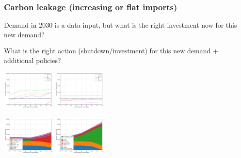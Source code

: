 \documentclass[xcolor=dvipsnames]{beamer}
\begin{document}
\begin{frame}
  \frametitle{Carbon leakage (increasing or flat imports)}

  \item Demand in 2030 is a data input, but what is the right investment now for this new demand?
  \item What is the right action (shutdown/investment) for this new demand + additional policies?



  \includegraphics[width=0.2\textwidth]{includes/leakage_shutdowns_agg_exim.png}
  \includegraphics[width=0.2\textwidth]{includes/no_leakage_shutdowns_agg_exim.png}

  \includegraphics[width=0.2\textwidth]{includes/leakage_shutdowns_agg_capacity_cntlreg.png}
  \includegraphics[width=0.2\textwidth]{includes/no_leakage_shutdowns_agg_capacity_cntlreg.png}


\end{frame}
\end{document}
